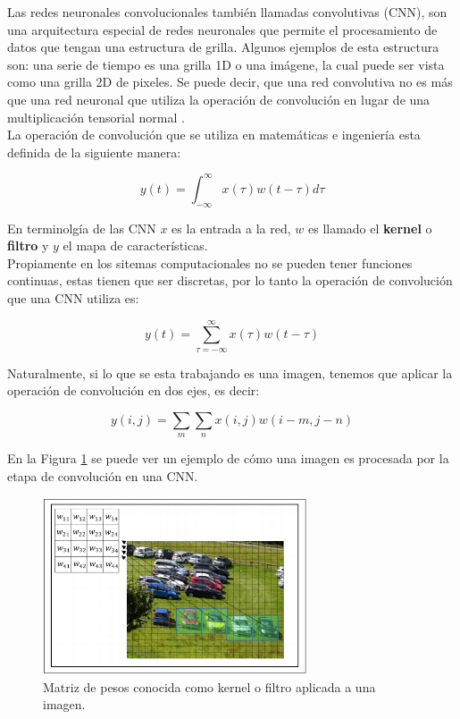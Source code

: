     Las redes neuronales convolucionales también llamadas convolutivas (CNN), son una arquitectura especial de redes neuronales que permite el procesamiento de datos que tengan una estructura de grilla. Algunos ejemplos de esta estructura son: una serie de tiempo es una grilla 1D o una imágene, la cual puede ser vista como una grilla 2D de pixeles. Se puede decir, que una red convolutiva no es más que una red neuronal que utiliza la operación de convolución en lugar de una multiplicación tensorial normal \cite{deeplearningbook}. \\
    
    La operación de convolución que se utiliza en matemáticas e ingeniería esta definida de la siguiente manera:
    
    \begin{equation}
    	y(t) = \int_{-\infty}^{\infty} x(\tau)w(t-\tau)d\tau
    \end{equation}
    
    En terminolgía de las CNN $x$ es la entrada a la red, $w$ es llamado el \textbf{kernel} o \textbf{filtro} y $y$ el mapa de características. \\
    
    Propiamente en los sitemas computacionales no se pueden tener funciones continuas, estas tienen que ser discretas, por lo tanto la operación de convolución que una CNN utiliza es:
    
    \begin{equation}
    	y(t) = \sum_{\tau = -\infty}^{\infty} x(\tau)w(t-\tau)
    \end{equation}
    
    Naturalmente, si lo que se esta trabajando es una imagen, tenemos que aplicar la operación de convolución en dos ejes, es decir:
    
    \begin{equation}
    	y(i,j) = \sum_{m}\sum_{n} x(i,j)w(i-m, j-n)
    \end{equation}
    
    En la Figura \ref{fig:CNNFilter} se puede ver un ejemplo de cómo una imagen es procesada por la etapa de convolución en una CNN.
    
    \begin{figure}[H]
    	\centering
    	\includegraphics[width=0.7\textwidth]{capitulo2/images/CNN_window.png}
    	\caption{Matriz de pesos conocida como kernel o filtro aplicada a una imagen.}
    	\label{fig:CNNFilter}
    \end{figure}
    
